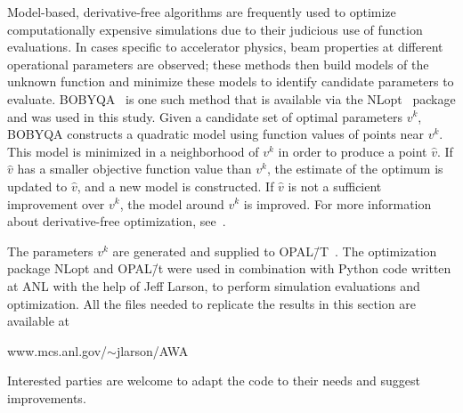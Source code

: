 \documentclass{iitthesis}
\begin{document}
Model-based, derivative-free algorithms are frequently used to optimize
computationally expensive simulations due to their judicious use of function
evaluations. In cases specific to accelerator physics, 
beam properties at different operational parameters are observed;
these methods then build models of the unknown
function and minimize these models to identify candidate parameters to 
evaluate. BOBYQA~\cite{bobyqa} is one such method that is available via the
NLopt~\cite{nlopt} package and was used in this study. 
Given a candidate set of optimal parameters $v^k$, BOBYQA
constructs a quadratic model using function values of points near $v^k$. 
This model is minimized in a neighborhood of $v^k$ in order to produce a point $\hat{v}$. If $\hat{v}$ has a smaller objective function value than $v^k$, 
the estimate of the optimum is updated to $\hat{v}$, and a new model is constructed. 
If $\hat{v}$ is not a sufficient improvement over $v^k$, 
the model around $v^k$ is improved. For more
information about derivative-free optimization, see~\cite{Conn2009a}.

The parameters $v^k$ are generated and supplied to OPAL\=/T~\cite{opal}. 
The optimization package NLopt and OPAL\=/t were used
in combination with Python code written at ANL with the help 
of Jeff Larson, to perform simulation evaluations and optimization.
All the files needed to replicate the results in this section are available at
\begin{center}
	www.mcs.anl.gov/$\sim$jlarson/AWA
\end{center}
Interested parties are welcome to adapt the code to their needs
and suggest improvements.
\end{document}
